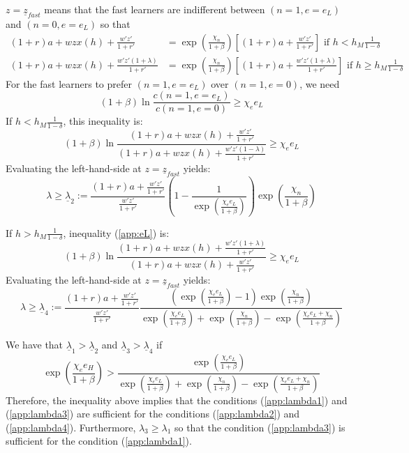 \documentclass[12pt]{article}
\begin{document}
$z=\underline{z}_{fast}$ means that the fast learners are indifferent between $(n=1,e=e_L)$ and $(n=0,e=e_L)$ so that
\begin{align}
    (1+r)a+wzx(h)+\frac{w'z'}{1+r'}&=\exp(\frac{\chi_n}{1+\beta})\left[(1+r)a+\frac{w'z'}{1+r'}\right] \text{ if } h<h_M\frac{1}{1-\delta} \\
    (1+r)a+wzx(h)+\frac{w'z'(1+\lambda)}{1+r'}&=\exp(\frac{\chi_n}{1+\beta})\left[(1+r)a+\frac{w'z'(1+\lambda)}{1+r'}\right] \text{ if } h \geq h_M\frac{1}{1-\delta} 
\end{align}
For the fast learners to prefer $(n=1,e=e_L)$ over $(n=1,e=0)$, we need
\begin{equation}\label{app:eL}
    (1+\beta)\ln\frac{c(n=1,e=e_L)}{c(n=1,e=0)} \geq \chi_e e_L
\end{equation}
If $h<h_M\frac{1}{1-\delta}$, this inequality is:
\begin{equation*}
    (1+\beta)\ln\frac{(1+r)a+wzx(h)+\frac{w'z'}{1+r'}}{(1+r)a+wzx(h)+\frac{w'z'(1-\lambda)}{1+r'}} \geq \chi_e e_L 
\end{equation*}
Evaluating the left-hand-side at $z=\underline{z}_{fast}$ yields:
\begin{equation}
    \lambda \geq \underline{\lambda}_2:=\frac{(1+r)a+\frac{w'z'}{1+r'}}{\frac{w'z'}{1+r'}}\left(1-\frac{1}{\exp(\frac{\chi_e e_L}{1+\beta})}\right)\exp(\frac{\chi_n}{1+\beta}) \label{app:lambda2}
\end{equation}

If $h>h_M\frac{1}{1-\delta}$, inequality (\ref{app:eL}) is:
\begin{equation*}
    (1+\beta)\ln\frac{(1+r)a+wzx(h)+\frac{w'z'(1+\lambda)}{1+r'}}{(1+r)a+wzx(h)+\frac{w'z'}{1+r'}} \geq \chi_e e_L 
\end{equation*}
Evaluating the left-hand-side at $z=\underline{z}_{fast}$ yields:
\begin{equation}
    \lambda \geq \underline{\lambda}_4:=\frac{(1+r)a+\frac{w'z'}{1+r'}}{\frac{w'z'}{1+r'}}\frac{\left(\exp(\frac{\chi_e e_L}{1+\beta})-1\right)\exp(\frac{\chi_n}{1+\beta})}{\exp(\frac{\chi_e e_L}{1+\beta})+\exp(\frac{\chi_n}{1+\beta})-\exp(\frac{\chi_e e_L + \chi_n}{1+\beta})} \label{app:lambda4}
\end{equation}

We have that $\underline{\lambda}_1>\underline{\lambda}_2$ and $\underline{\lambda}_3>\underline{\lambda}_4$ if 
\begin{equation} \label{app:eH}
    \exp(\frac{\chi_e e_H}{1+\beta})>\frac{\exp(\frac{\chi_e e_L}{1+\beta})}{\exp(\frac{\chi_e e_L}{1+\beta})+\exp(\frac{\chi_n}{1+\beta})-\exp(\frac{\chi_e e_L + \chi_n}{1+\beta})}
\end{equation}
Therefore, the inequality above implies that the conditions (\ref{app:lambda1}) and (\ref{app:lambda3}) are sufficient for the conditions (\ref{app:lambda2}) and (\ref{app:lambda4}). Furthermore, $\lambda_3 \geq \lambda_1$ so that the condition (\ref{app:lambda3}) is sufficient for the condition (\ref{app:lambda1}). 
\end{document}
